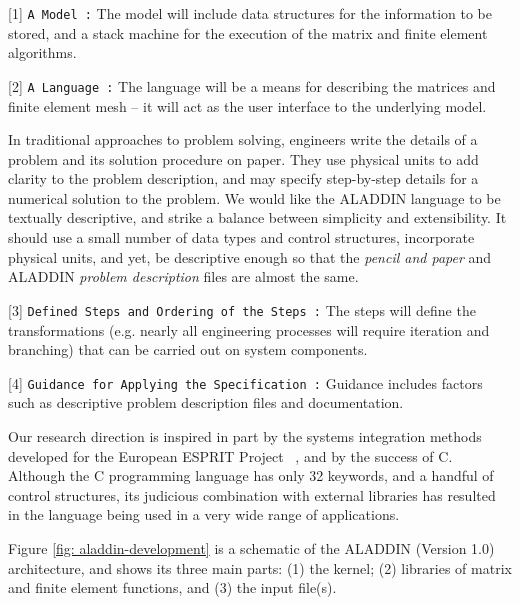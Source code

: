 \begin{description}
\item{[1]}
{\tt A Model :} The model will include data structures
for the information to be stored, and a stack machine for the execution
of the matrix and finite element algorithms.

\item{[2]}
{\tt A Language :} The language will be a means for describing the
matrices and finite element mesh -- it will
act as the user interface to the underlying model.

In traditional approaches to problem solving,
engineers write the details of a problem and its solution procedure on paper.
They use physical units to add clarity to the problem description,
and may specify step-by-step details for a numerical solution to the problem.
We would like the ALADDIN language to be textually descriptive,
and strike a balance between simplicity and extensibility.
It should use a small number of data types and control structures,
incorporate physical units, and yet, be descriptive enough so
that the {\it pencil and paper} and
ALADDIN {\it problem description} files are almost the same.

\item{[3]}
{\tt Defined Steps and Ordering of the Steps :} The steps will define the
transformations (e.g. nearly all engineering processes will require iteration and branching)
that can be carried out on system components.

\item{[4]}
{\tt Guidance for Applying the Specification :}
Guidance includes factors such as descriptive problem description
files and documentation.

\end{description}

\vspace{0.15 in}\noindent
Our research direction is inspired in part by the systems
integration methods developed for the European ESPRIT Project ~\cite{kronlof93},
and by the success of C.
Although the C programming language has only 32 keywords,
and a handful of control structures, its judicious combination with
external libraries has resulted in the language
being used in a very wide range of applications.

\vspace{0.15 in}
\noindent\hspace{0.5 in}
Figure \ref{fig: aladdin-development} is a
schematic of the ALADDIN (Version 1.0) architecture,
and shows its three main parts: (1) the kernel;
(2) libraries of matrix and finite element functions, and (3) the input file(s).

